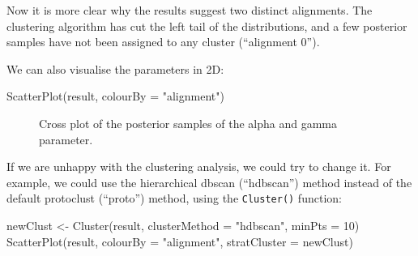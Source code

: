 \documentclass[
  letterpaper,
  DIV=11,
  numbers=noendperiod]{scrartcl}
\newenvironment{Shaded}{\begin{snugshade}}{\end{snugshade}}
\newcommand{\AttributeTok}[1]{\textcolor[rgb]{0.40,0.45,0.13}{#1}}
\newcommand{\DecValTok}[1]{\textcolor[rgb]{0.68,0.00,0.00}{#1}}
\newcommand{\FunctionTok}[1]{\textcolor[rgb]{0.28,0.35,0.67}{#1}}
\newcommand{\NormalTok}[1]{\textcolor[rgb]{0.00,0.23,0.31}{#1}}
\newcommand{\OtherTok}[1]{\textcolor[rgb]{0.00,0.23,0.31}{#1}}
\newcommand{\StringTok}[1]{\textcolor[rgb]{0.13,0.47,0.30}{#1}}
\begin{document}
Now it is more clear why the results suggest two distinct alignments.
The clustering algorithm has cut the left tail of the distributions, and
a few posterior samples have not been assigned to any cluster
(``alignment 0'').

We can also visualise the parameters in 2D:

\begin{Shaded}
\begin{Highlighting}[]
\FunctionTok{ScatterPlot}\NormalTok{(result, }\AttributeTok{colourBy =} \StringTok{"alignment"}\NormalTok{)}
\end{Highlighting}
\end{Shaded}

\begin{figure}[H]


\caption{\label{fig-9}Cross plot of the posterior samples of the alpha
and gamma parameter.}

\end{figure}%

If we are unhappy with the clustering analysis, we could try to change
it. For example, we could use the hierarchical dbscan (``hdbscan'')
method instead of the default protoclust (``proto'') method, using the
\texttt{Cluster()} function:

\begin{Shaded}
\begin{Highlighting}[]
\NormalTok{newClust }\OtherTok{\textless{}{-}} \FunctionTok{Cluster}\NormalTok{(result, }\AttributeTok{clusterMethod =} \StringTok{"hdbscan"}\NormalTok{, }\AttributeTok{minPts =} \DecValTok{10}\NormalTok{)}
\FunctionTok{ScatterPlot}\NormalTok{(result, }\AttributeTok{colourBy =} \StringTok{"alignment"}\NormalTok{, }\AttributeTok{stratCluster =}\NormalTok{ newClust)}
\end{Highlighting}
\end{Shaded}
\end{document}
